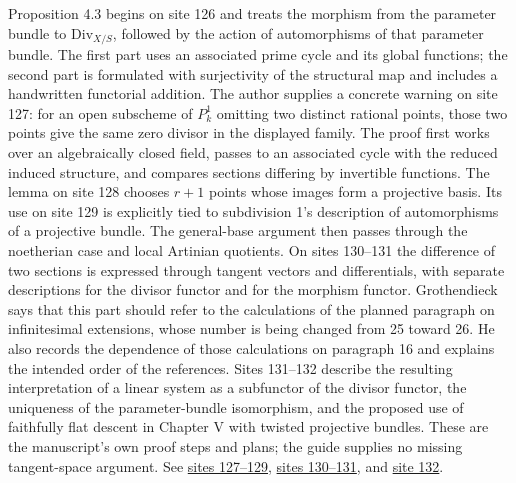 Proposition 4.3 begins on site 126 and treats the morphism from the parameter bundle to \(\mathrm{Div}_{X/S}\), followed by the action of automorphisms of that parameter bundle. The first part uses an associated prime cycle and its global functions; the second part is formulated with surjectivity of the structural map and includes a handwritten functorial addition. The author supplies a concrete warning on site 127: for an open subscheme of \(P^1_k\) omitting two distinct rational points, those two points give the same zero divisor in the displayed family. The proof first works over an algebraically closed field, passes to an associated cycle with the reduced induced structure, and compares sections differing by invertible functions. The lemma on site 128 chooses \(r+1\) points whose images form a projective basis. Its use on site 129 is explicitly tied to subdivision 1's description of automorphisms of a projective bundle. The general-base argument then passes through the noetherian case and local Artinian quotients. On sites 130--131 the difference of two sections is expressed through tangent vectors and differentials, with separate descriptions for the divisor functor and for the morphism functor. Grothendieck says that this part should refer to the calculations of the planned paragraph on infinitesimal extensions, whose number is being changed from 25 toward 26. He also records the dependence of those calculations on paragraph 16 and explains the intended order of the references. Sites 131--132 describe the resulting interpretation of a linear system as a subfunctor of the divisor functor, the uniqueness of the parameter-bundle isomorphism, and the proposed use of faithfully flat descent in Chapter V with twisted projective bundles. These are the manuscript's own proof steps and plans; the guide supplies no missing tangent-space argument. See \href{https://grothendieck.umontpellier.fr/web/viewer.html?file=../25.pdf#page=128}{sites 127--129}, \href{https://grothendieck.umontpellier.fr/web/viewer.html?file=../25.pdf#page=131}{sites 130--131}, and \href{https://grothendieck.umontpellier.fr/web/viewer.html?file=../25.pdf#page=133}{site 132}.

